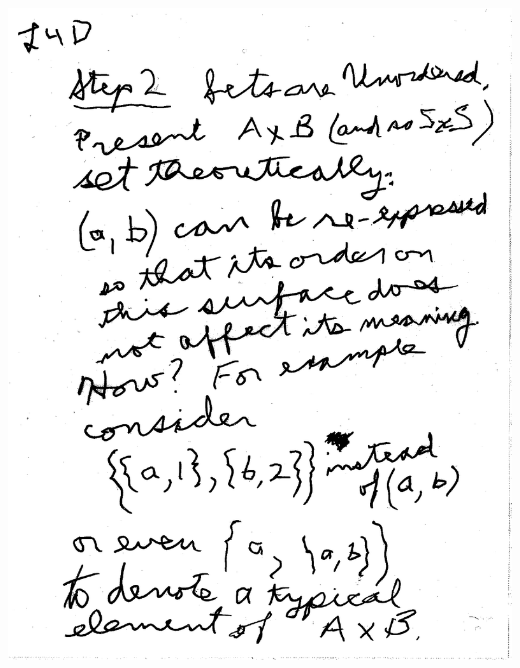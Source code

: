 \documentclass[10pt,a4paper]{article}
\begin{document}
{{\includegraphics[scale=0.5]{Pages/generateN4.pdf}

\newpage

}}
\end{document}
